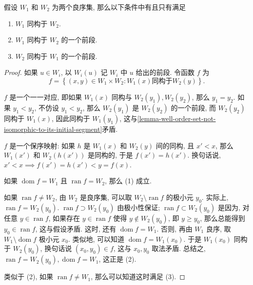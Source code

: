 \begin{theorem}
  假设 \( W_1 \) 和 \( W_2 \) 为两个良序集, 那么以下条件中有且只有满足
  \begin{enumerate}
    \item \( W_1 \) 同构于 \( W_2 \).
    \item \( W_1 \) 同构于 \( W_2 \) 的一个前段.
    \item \( W_2 \) 同构于 \( W_1 \) 的一个前段.
  \end{enumerate}
\end{theorem}
\begin{proof}
  如果 \( u \in W_i \), 以 \( W_i(u) \) 记 \( W_i \) 中 \( u \) 给出的前段.
  令函数 \( f \) 为
  \[
    f = \left\lbrace (x, y) \in W_1 \times W_2: W_1(x) \text{同构于} W_2(y)
    \right\rbrace.
  \]

  \( f \) 是一个一一对应, 即如果 \( W_1(x) \) 同构与 \( W_2(y_1), W_2(y_2) \),
  那么 \( y_1 = y_2 \).
  如果 \( y_1 < y_2 \), 不仿设 \( y_1 < y_2 \), 那么 \( W_2(y_1) \) 是 \( W_2(y_2)
  \) 的一个前段, 而 \( W_2(y_2) \) 同构于 \( W_1(x) \), 因此同构于 \( W_1(y_1)
  \), 这与\cref{lemma-well-order-set-not-isomorphic-to-its-initial-segment}矛盾.

  \( f \) 是一个保序映射: 如果 \( h \) 是 \( W_1(x) \) 和 \( W_2(y) \)
  间的同构, 且 \( x' < x \), 那么 \( W_1(x') \) 和 \( W_2(h(x
  ')) \) 是同构的, 于是 \( f(x') = h(x') \).
  换句话说, \( x' < x \implies f(x') = h(x') < y = f(x) \).

  如果 \( \operatorname{dom} f = W_1 \) 且 \( \operatorname{ran} f = W_2 \),
  那么 (1) 成立.

  如果 \( \operatorname{ran} f \neq W_2 \), 由 \( W_2 \) 是良序集, 可以取 \(
  W_2 \setminus \operatorname{ran} f \) 的极小元 \( y_0 \).
  实际上, \( \operatorname{ran} f = W_2(y_0) \).
  \( \operatorname{ran} f \supset W_2(y_0) \) 由极小性保证;
  \( \operatorname{ran} f \subset W_2(y_0) \) 是因为, 对任意 \( y \in
  \operatorname{ran} f \), 如果存在 \( y \in \operatorname{ran} f \) 使得 \( y
  \notin W_2(y_0) \), 即 \( y \geq y_0 \), 那么总能得到 \( y_0 \in
  \operatorname{ran} f \), 这与假设矛盾.
  这时, 还有 \( \operatorname{dom}f = W_1 \).
  否则, 再由 \( W_1 \) 良序, 取 \( W_1 \setminus \operatorname{dom} f \) 极小元
  \( x_0 \).
  类似地, 可以知道 \( \operatorname{dom} f = W_1(x_0) \).
  于是 \( W_1(x_0) \) 同构于 \( W_2(y_0) \), 换句话说 \( (x_0, y_0) \in f \),
  这与 \( x_0, y_0 \) 取法矛盾.
  总结之, \( \operatorname{ran}f = W_2(y_0), \operatorname{dom} f = W_1 \),
  这正是 (2).

  类似于 (2), 如果 \( \operatorname{ran} f \neq W_1 \), 那么可以知道这时满足
  (3).
\end{proof}

